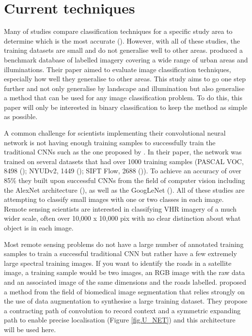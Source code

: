 \section*{Current techniques}
Many of studies compare classification techniques for a specific study area to determine which is the most accurate (\cite{fauvel12,mnih13,volpi17}). However, with all of these studies, the training datasets are small and do not generalise well to other areas. \citet{maggiori17a} produced a benchmark database of labelled imagery covering a wide range of urban areas and illuminations. Their paper aimed to evaluate image classification techniques, especially how well they generalise to other areas. This study aims to go one step further and not only generalise by landscape and illumination but also generalise a method that can be used for any image classification problem. To do this, this paper will only be interested in binary classification to keep the method as simple as possible. 
\par
A common challenge for scientists implementing their convolutional neural network is not having enough training samples to successfully train the traditional CNNs such as the one proposed by \citet{shelhamer17}. In their paper, the network was trained on several datasets that had over 1000 training samples (PASCAL VOC, 8498 (\cite{hariharan11}); NYUDv2, 1449 (\cite{silberman12}); SIFT Flow, 2688 (\cite{liu10sift})). To achieve an accuracy of over 85\% they built upon successful CNNs from the field of computer vision including the AlexNet architecture (\cite{krizhevsky17}), as well as the GoogLeNet (\cite{szegedy15}). All of these studies are attempting to classify small images with one or two classes in each image. Remote sensing scientists are interested in classifying VHR imagery of a much wider scale, often over 10,000 x 10,000 pix with no clear distinction about what object is in each image.
\par
Most remote sensing problems do not have a large number of annotated training samples to train a successful traditional CNN but rather have a few extremely large spectral training images. If you want to identify the roads in a satellite image, a training sample would be two images, an RGB image with the raw data and an associated image of the same dimensions and the roads labelled. \citet{ronneberger15} proposed a method from the field of biomedical image segmentation that relies strongly on the use of data augmentation to synthesise a large training dataset. They propose a contracting path of convolution to record context and a symmetric expanding path to enable precise localisation (Figure \ref{fig.U_NET}) and this architecture will be used here.
